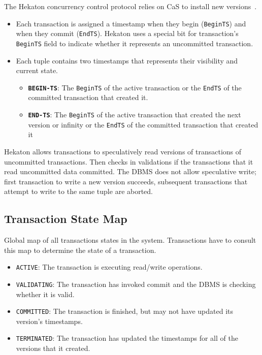 \documentclass[11pt]{article}
\newcommand{\mvccField}[1]{\texttt{#1}\xspace}
\begin{document}
The Hekaton concurrency control protocol relies on CaS to install new 
versions~\cite{p298-larson}.
\begin{itemize}
    \item
    Each transaction is assigned a timestamp when they begin (\mvccField{BeginTS}) and when they 
    commit (\mvccField{EndTS}). Hekaton uses a special bit for transaction's \mvccField{BeginTS} 
    field to indicate whether it represents an uncommitted transaction.
        
    \item
    Each tuple contains two timestamps that represents their visibility and current state.
    \begin{itemize}
        \item \textbf{\texttt{BEGIN-TS}}:
        The \mvccField{BeginTS} of the active transaction or the \mvccField{EndTS} of the committed 
        transaction that created it.
            
        \item \textbf{\mvccField{END-TS}}:
        The \mvccField{BeginTS} of the active transaction that created the next version or 
        infinity or the \mvccField{EndTS} of the committed transaction that created it
    \end{itemize}
\end{itemize}

Hekaton allows transactions to speculatively read versions of transactions of uncommitted 
transactions. Then checks in validations if the transactions that it read uncommitted data 
committed. The DBMS does not allow speculative write; first transaction to write a new version 
succeeds, subsequent transactions that attempt to write to the same tuple are aborted.

\subsection*{Transaction State Map}
Global map of all transactions states in the system. Transactions have to consult this map to 
determine the state of a transaction.
\begin{itemize}
    \item \texttt{ACTIVE}:
    The transaction is executing read/write operations.
    
    \item \texttt{VALIDATING}:
    The transaction has invoked commit and the DBMS is checking whether it is valid.
    
    \item \texttt{COMMITTED}:
    The transaction is finished, but may not have updated its version's timestamps.
    
    \item \texttt{TERMINATED}:
    The transaction has updated the timestamps for all of the versions that it created.
\end{itemize}
\end{document}
